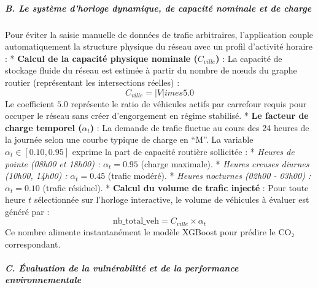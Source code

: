 \documentclass[10pt, a4paper]{article}
\begin{document}
\subparagraph{B. Le système d'horloge dynamique, de capacité nominale et
de
charge}\label{b.-le-systuxe8me-dhorloge-dynamique-de-capacituxe9-nominale-et-de-charge}

Pour éviter la saisie manuelle de données de trafic arbitraires,
l'application couple automatiquement la structure physique du réseau
avec un profil d'activité horaire : * \textbf{Calcul de la capacité
physique nominale (\(C_{ville}\))} : La capacité de stockage fluide du
réseau est estimée à partir du nombre de nœuds du graphe routier
(représentant les intersections réelles) :
\[C_{ville} = |V|   imes 5.0\] Le coefficient \(5.0\) représente le
ratio de véhicules actifs par carrefour requis pour occuper le réseau
sans créer d'engorgement en régime stabilisé. * \textbf{Le facteur de
charge temporel (\(\alpha_t\))} : La demande de trafic fluctue au cours
des 24 heures de la journée selon une courbe typique de charge en ``M''.
La variable \(\alpha_t \in [0.10, 0.95]\) exprime la part de capacité
routière sollicitée : * \emph{Heures de pointe (08h00 et 18h00) :}
\(\alpha_t = 0.95\) (charge maximale). * \emph{Heures creuses diurnes
(10h00, 14h00) :} \(\alpha_t = 0.45\) (trafic modéré). * \emph{Heures
nocturnes (02h00 - 03h00) :} \(\alpha_t = 0.10\) (trafic résiduel). *
\textbf{Calcul du volume de trafic injecté} : Pour toute heure \(t\)
sélectionnée sur l'horloge interactive, le volume de véhicules à évaluer
est généré par : \[\text{nb\_total\_veh} = C_{ville} \times \alpha_t\]
Ce nombre alimente instantanément le modèle XGBoost pour prédire le CO₂
correspondant.

\subparagraph{C. Évaluation de la vulnérabilité et de la performance
environnementale}\label{c.-uxe9valuation-de-la-vulnuxe9rabilituxe9-et-de-la-performance-environnementale}
\end{document}
